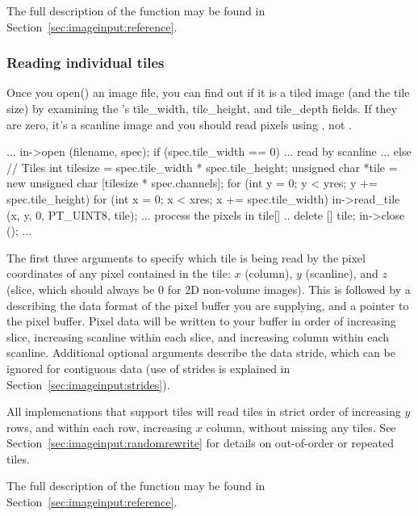 The full description of the \readscanline function may be found
in Section~\ref{sec:imageinput:reference}.

\subsubsection{Reading individual tiles}

Once you {\kw open()} an image file, you can find out if it is a tiled
image (and the tile size) by examining the \ImageIOFormatSpec's {\cf
  tile_width}, {\cf tile_height}, and {\cf tile_depth} fields.
If they are zero, it's a scanline image and you should read pixels
using \readscanline, not \readtile.

\begin{code}
        ...
        in->open (filename, spec);
        if (spec.tile_width == 0) {
            ... read by scanline ...
        } else {
            // Tiles
            int tilesize = spec.tile_width * spec.tile_height;
            unsigned char *tile = new unsigned char [tilesize * spec.channels];
            for (int y = 0;  y < yres;  y += spec.tile_height) {
                for (int x = 0;  x < xres;  x += spec.tile_width) {
                    in->read_tile (x, y, 0, PT_UINT8, tile);
                    ... process the pixels in tile[] ..
                }
            }
            delete [] tile;
        }
        in->close ();
        ...
\end{code}

The first three arguments to \readtile specify which tile is
being read by the pixel coordinates of any pixel contained in the
tile: $x$ (column), $y$ (scanline), and $z$ (slice, which should always
be 0 for 2D non-volume images).  This is followed by a \ParamBaseType
describing the data format of the pixel buffer you are supplying, and a
pointer to the pixel buffer.  Pixel data will be written to your buffer
in order of increasing slice, increasing
scanline within each slice, and increasing column within each scanline.
Additional optional arguments describe the data stride, which can be
ignored for contiguous data (use of strides is explained in
Section~\ref{sec:imageinput:strides}).

All \ImageInput implemenations that support tiles will read tiles in
strict order of increasing $y$ rows, and within each row, increasing $x$
column, without missing any tiles.  See
Section~\ref{sec:imageinput:randomrewrite} for details on out-of-order
or repeated tiles.

The full description of the \readtile function may be found
in Section~\ref{sec:imageinput:reference}.


